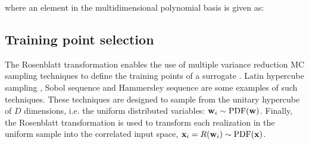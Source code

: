 \documentclass[preprint,12pt]{elsarticle}
\begin{document}

\noindent where an element in the multidimensional polynomial basis is given as:





\subsection{Training point selection}

The Rosenblatt transformation enables the use of multiple variance reduction MC sampling techniques to define the training points of a surrogate \cite{feinberg2015chaospy}. Latin hypercube sampling \cite{mckay2000comparison}, Sobol sequence \cite{sobol1967distribution} and Hammersley sequence \cite{hammersley1960monte} are some examples of such techniques. These techniques are designed to sample from the unitary hypercube of $D$ dimensions, i.e. the uniform distributed variables: $\mathbf{w}_i \sim \mathrm{PDF}(\mathbf{w})$. Finally, the Rosenblatt transformation is used to transform each realization in the uniform sample into the correlated input space, $\mathbf{x}_i = R(\mathbf{w}_i) \sim \mathrm{PDF}(\mathbf{x})$.
\end{document}
